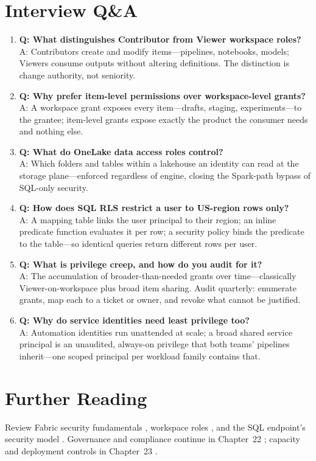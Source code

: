 \section{Interview Q\&A}
\begin{enumerate}
    \item \textbf{Q: What distinguishes Contributor from Viewer workspace roles?}\\
    A: Contributors create and modify items---pipelines, notebooks, models; Viewers consume outputs without altering definitions. The distinction is change authority, not seniority.
    \item \textbf{Q: Why prefer item-level permissions over workspace-level grants?}\\
    A: A workspace grant exposes every item---drafts, staging, experiments---to the grantee; item-level grants expose exactly the product the consumer needs and nothing else.
    \item \textbf{Q: What do OneLake data access roles control?}\\
    A: Which folders and tables within a lakehouse an identity can read at the storage plane---enforced regardless of engine, closing the Spark-path bypass of SQL-only security.
    \item \textbf{Q: How does SQL RLS restrict a user to US-region rows only?}\\
    A: A mapping table links the user principal to their region; an inline predicate function evaluates it per row; a security policy binds the predicate to the table---so identical queries return different rows per user.
    \item \textbf{Q: What is privilege creep, and how do you audit for it?}\\
    A: The accumulation of broader-than-needed grants over time---classically Viewer-on-workspace plus broad item sharing. Audit quarterly: enumerate grants, map each to a ticket or owner, and revoke what cannot be justified.
    \item \textbf{Q: Why do service identities need least privilege too?}\\
    A: Automation identities run unattended at scale; a broad shared service principal is an unaudited, always-on privilege that both teams' pipelines inherit---one scoped principal per workload family contains that.
\end{enumerate}

\section{Further Reading}
Review Fabric security fundamentals \cite{microsoftFabricSecurity}, workspace roles \cite{microsoftFabricWorkspaces}, and the SQL endpoint's security model \cite{microsoftFabricSqlEndpoint}. Governance and compliance continue in Chapter~22 \cite{microsoftPurviewFabric}; capacity and deployment controls in Chapter~23 \cite{microsoftFabricGitIntegration}.

